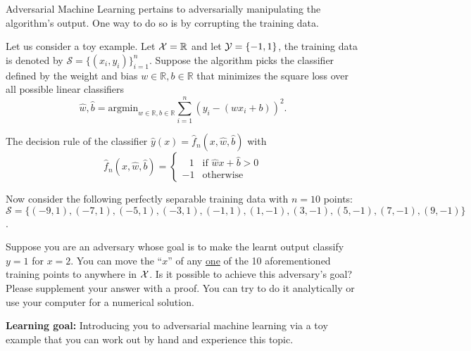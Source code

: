 Adversarial Machine Learning pertains to adversarially manipulating the algorithm's output. One way to do so is by corrupting the training data. 

Let us consider a toy example. Let ${\cal X} = \mathbb{R}$ and let ${\cal Y} = \{-1,1\}$, the training data is denoted by  $\mathcal{S}=\{(x_{i},y_{i})\}^{n}_{i=1}$. Suppose the algorithm picks the classifier defined by the weight and bias $w \in \mathbb{R}, b \in \mathbb{R}$ that minimizes the square loss over all possible linear classifiers
\[\hat{w},\hat{b} = \text{argmin}_{w \in \mathbb{R},b \in \mathbb{R}} \sum^{n}_{i=1}(y_i-(wx_i+b))^{2}.
\]

The decision rule of the classifier $\hat{y}(x)=\hat{f}_{n}(x,\hat{w},\hat{b})$ with
\[\hat{f}_{n}(x,\hat{w},\hat{b}) = 
\begin{cases}
\;\;\,1 & \text{if } \hat{w} x + \hat{b} > 0 \\
-1 & \text{otherwise}
\end{cases}
\]

Now consider the following perfectly separable training data with $n=10$ points: \\
$\mathcal{S} = \{(-9,1), (-7,1),(-5,1),(-3,1),(-1,1),(1,-1),(3,-1),(5,-1),(7,-1),(9,-1)\}$.

Suppose you are an adversary whose goal is to make the learnt output classify $y=1$ for $x=2$. You can move the ``$x$'' of any \underline{one} of the 10 aforementioned training points to anywhere in ${\cal X}$. Is it possible to achieve this adversary's goal? Please supplement your answer with a proof. You can try to do it analytically or use your computer for a numerical solution.

{\bf Learning goal:} Introducing you to adversarial machine learning via a toy example that you can work out by hand and experience this topic. 
